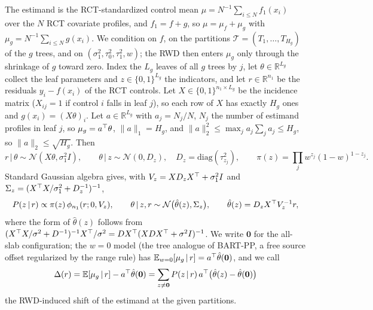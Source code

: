 \documentclass[11pt]{article}
\newcommand{\E}{\mathbb{E}}
\newcommand{\Normal}{\mathcal{N}}
\newcommand{\given}{\,\vert\,}
\theoremstyle{definition}
\theoremstyle{plain}
\begin{document}
{The estimand is the RCT-standardized control mean $\mu=N^{-1}\sum_{i\le N}f_1(x_i)$ over the $N$ RCT covariate profiles, and $f_1=f+g$, so $\mu=\mu_f+\mu_g$ with $\mu_g=N^{-1}\sum_{i\le N}g(x_i)$. We condition on $f$, on the partitions $\mathcal T=(T_1,\dots,T_{H_g})$ of the $g$ trees, and on $(\sigma_1^2,\tau_0^2,\tau_1^2,w)$; the RWD then enters $\mu_g$ only through the shrinkage of $g$ toward zero. Index the $L_g$ leaves of all $g$ trees by $j$, let $\theta\in\mathbb R^{L_g}$ collect the leaf parameters and $z\in\{0,1\}^{L_g}$ the indicators, and let $r\in\mathbb R^{n_1}$ be the residuals $y_i-f(x_i)$ of the RCT controls. Let $X\in\{0,1\}^{n_1\times L_g}$ be the incidence matrix ($X_{ij}=1$ if control $i$ falls in leaf $j$), so each row of $X$ has exactly $H_g$ ones and $g(x_i)=(X\theta)_i$. Let $a\in\mathbb R^{L_g}$ with $a_j=N_j/N$, $N_j$ the number of estimand profiles in leaf $j$, so $\mu_g=a^{\top}\theta$, $\|a\|_1=H_g$, and $\|a\|_2^2\le\max_ja_j\sum_ja_j\le H_g$, so $\|a\|_2\le\sqrt{H_g}$. Then
\begin{equation}
r\given\theta\sim\Normal(X\theta,\sigma_1^2I),\qquad \theta\given z\sim\Normal(0,D_z),\quad D_z=\mathrm{diag}(\tau^2_{z_j}),\qquad \pi(z)=\prod_jw^{z_j}(1-w)^{1-z_j}.
\label{eq:linform}
\end{equation}
Standard Gaussian algebra gives, with $V_z=XD_zX^{\top}+\sigma_1^2I$ and $\Sigma_z=(X^{\top} X/\sigma_1^2+D_z^{-1})^{-1}$,
\begin{equation}
P(z\given r)\propto\pi(z)\,\phi_{n_1}(r;0,V_z),\qquad
\theta\given z,r\sim\Normal\bigl(\hat\theta(z),\Sigma_z\bigr),\qquad \hat\theta(z)=D_zX\tr V_z^{-1}r,
\label{eqA:zpost}
\end{equation}
where the form of $\hat\theta(z)$ follows from $(X^{\top} X/\sigma^2+D^{-1})^{-1}X^{\top}/\sigma^2=DX^{\top}(XDX^{\top}+\sigma^2I)^{-1}$. We write $\mathbf 0$ for the all-slab configuration; the $w=0$ model (the tree analogue of BART-PP, a free source offset regularized by the range rule) has $\E_{w=0}[\mu_g\given r]=a\tr\hat\theta(\mathbf 0)$, and we call
\begin{equation}
\Delta(r)=\E[\mu_g\given r]-a\tr\hat\theta(\mathbf 0)=\sum_{z\ne\mathbf 0}P(z\given r)\,a\tr\bigl(\hat\theta(z)-\hat\theta(\mathbf 0)\bigr)
\label{eq:Delta}
\end{equation}
the RWD-induced shift of the estimand at the given partitions.

}
\end{document}
